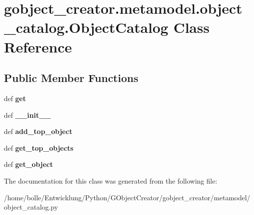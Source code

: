 \hypertarget{classgobject__creator_1_1metamodel_1_1object__catalog_1_1ObjectCatalog}{
\section{gobject\_\-creator.metamodel.object\_\-catalog.ObjectCatalog Class Reference}
\label{classgobject__creator_1_1metamodel_1_1object__catalog_1_1ObjectCatalog}
}
\subsection*{Public Member Functions}
\begin{DoxyCompactItemize}
\item 
\hypertarget{classgobject__creator_1_1metamodel_1_1object__catalog_1_1ObjectCatalog_a94100a6ed04ec7d6e299e8310557ea31}{
def {\bfseries get}}
\label{classgobject__creator_1_1metamodel_1_1object__catalog_1_1ObjectCatalog_a94100a6ed04ec7d6e299e8310557ea31}

\item 
\hypertarget{classgobject__creator_1_1metamodel_1_1object__catalog_1_1ObjectCatalog_af86026f07ee98ef1a20e7206b018c363}{
def {\bfseries \_\-\_\-init\_\-\_\-}}
\label{classgobject__creator_1_1metamodel_1_1object__catalog_1_1ObjectCatalog_af86026f07ee98ef1a20e7206b018c363}

\item 
\hypertarget{classgobject__creator_1_1metamodel_1_1object__catalog_1_1ObjectCatalog_a3b92b9a19c4ec23cd8b243a70e78f45f}{
def {\bfseries add\_\-top\_\-object}}
\label{classgobject__creator_1_1metamodel_1_1object__catalog_1_1ObjectCatalog_a3b92b9a19c4ec23cd8b243a70e78f45f}

\item 
\hypertarget{classgobject__creator_1_1metamodel_1_1object__catalog_1_1ObjectCatalog_a71fcc7122e7359b7bb498afe6db0b9f6}{
def {\bfseries get\_\-top\_\-objects}}
\label{classgobject__creator_1_1metamodel_1_1object__catalog_1_1ObjectCatalog_a71fcc7122e7359b7bb498afe6db0b9f6}

\item 
\hypertarget{classgobject__creator_1_1metamodel_1_1object__catalog_1_1ObjectCatalog_ac3a969376c4da507fdaae23bce04a072}{
def {\bfseries get\_\-object}}
\label{classgobject__creator_1_1metamodel_1_1object__catalog_1_1ObjectCatalog_ac3a969376c4da507fdaae23bce04a072}

\end{DoxyCompactItemize}


The documentation for this class was generated from the following file:\begin{DoxyCompactItemize}
\item 
/home/bolle/Entwicklung/Python/GObjectCreator/gobject\_\-creator/metamodel/object\_\-catalog.py\end{DoxyCompactItemize}

